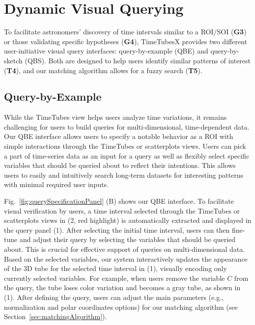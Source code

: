 \section{Dynamic Visual Querying}\label{sec:visualQuery}
To facilitate astronomers' discovery of time intervals similar to a ROI/SOI (\textbf{G3}) or those validating specific hypotheses (\textbf{G4}), 
TimeTubesX provides two different user-initiative visual query interfaces: query-by-example (QBE) and query-by-sketch (QBS).
Both are designed to help users identify similar patterns of interest (\textbf{T4}), and our matching algorithm allows for a fuzzy search (\textbf{T5}).

\subsection{Query-by-Example}\label{sec:QBE}
While the TimeTubes view helps users analyze time variations,
it remains challenging for users to build queries for multi-dimensional, time-dependent data.
Our QBE interface allows users to specify a notable behavior as a ROI with simple interactions through the TimeTubes or scatterplots views.
Users can pick a part of time-series data as an input for a query as well as flexibly select specific variables that should be queried about to reflect their intentions. 
This allows users to easily and intuitively search long-term datasets for interesting patterns with minimal required user inputs.

Fig.~\ref{fig:querySpecificationPanel} (B) shows our QBE interface.
To facilitate visual verification by users, a time interval selected through the TimeTubes or scatterplots views in (2, red highlight) is automatically extracted and displayed in the query panel (1).
After selecting the initial time interval, users can then fine-tune and adjust their query by selecting the variables that should be queried about. 
This is crucial for effective support of queries on multi-dimensional data.
Based on the selected variables, 
our system interactively updates the appearance of the 3D tube for the selected time interval in (1), visually encoding only currently selected variables.
For example, when users remove the variable $C$ from the query, the tube loses color variation and becomes a gray tube, as shown in (1).
After defining the query, users can adjust the main parameters (e.g., normalization and polar coordinates options) for our matching algorithm (see Section~\ref{sec:matchingAlgorithm}). 

